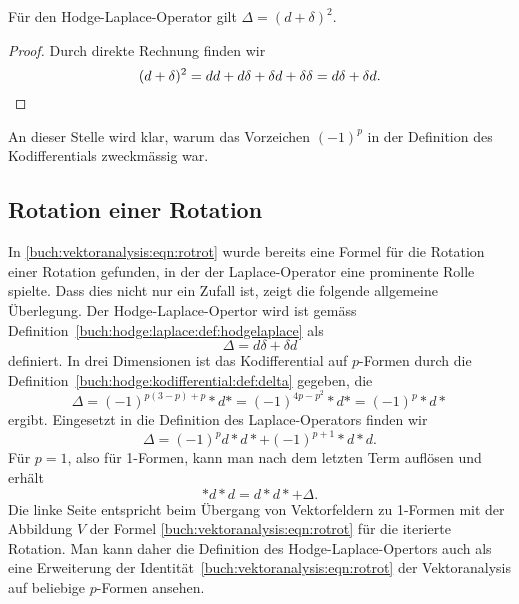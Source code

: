 \begin{satz}
Für den Hodge-Laplace-Operator gilt $\Delta = (d+\delta)^2$.
\end{satz}

\begin{proof}
Durch direkte Rechnung finden wir
\[
(d+\delta)^2
=
dd+d\delta+\delta d+\delta\delta
=
d\delta +\delta d.
\qedhere
\]
\end{proof}

An dieser Stelle wird klar, warum das Vorzeichen $(-1)^p$ in der
Definition des Kodifferentials zweckmässig war.

%
%
\subsection{Rotation einer Rotation
\label{buch:hodge:laplace:subsection:rotrot}}
In \eqref{buch:vektoranalysis:eqn:rotrot} wurde bereits eine Formel
für die Rotation einer Rotation gefunden, in der der Laplace-Operator
eine prominente Rolle spielte.
Dass dies nicht nur ein Zufall ist, zeigt die folgende allgemeine
Überlegung.
Der Hodge-Laplace-Opertor wird ist gemäss
Definition~\ref{buch:hodge:laplace:def:hodgelaplace}
als 
\[
\Delta 
=
d\delta + \delta d
\]
definiert.
In drei Dimensionen ist das Kodifferential auf $p$-Formen durch
die Definition~\ref{buch:hodge:kodifferential:def:delta} gegeben,
die
\[
\Delta
=
(-1)^{p(3-p)+p}
{*}d{*}
=
(-1)^{4p-p^2}
{*}d{*}
=
(-1)^p
{*}d{*}
\]
ergibt.
Eingesetzt in die Definition des Laplace-Operators finden wir
\[
\Delta
=
(-1)^p
d{*}d{*}
+
(-1)^{p+1}
{*}d{*}d.
\]
Für $p=1$, also für 1-Formen, kann man nach dem letzten Term auflösen
und erhält
\begin{equation}
{*}d{*}d
=
d{*}d{*}
+
\Delta.
\end{equation}
Die linke Seite entspricht beim Übergang von Vektorfeldern zu 1-Formen
mit der Abbildung $V$ der Formel \eqref{buch:vektoranalysis:eqn:rotrot}
für die iterierte Rotation.
Man kann daher die Definition des Hodge-Laplace-Opertors auch als
eine Erweiterung der Identität~\eqref{buch:vektoranalysis:eqn:rotrot}
der Vektoranalysis auf beliebige $p$-Formen ansehen.





